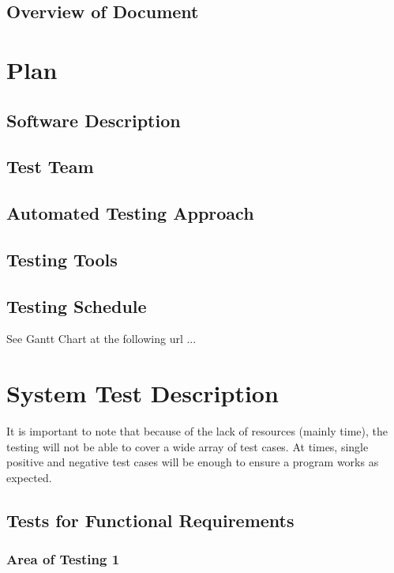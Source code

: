 \documentclass[12pt, titlepage]{article}
\begin{document}
\subsection{Overview of Document}
\section{Plan}
	
\subsection{Software Description}
\subsection{Test Team}
\subsection{Automated Testing Approach}
\subsection{Testing Tools}
\subsection{Testing Schedule}
		
See Gantt Chart at the following url ...
\section{System Test Description}

It is important to note that because of the lack of resources (mainly time), the testing will not be able to cover a wide array of test cases. At times, single positive and negative test cases will be enough to ensure a program works as expected. 	
\subsection{Tests for Functional Requirements}

\subsubsection{Area of Testing 1}		
\end{document}
